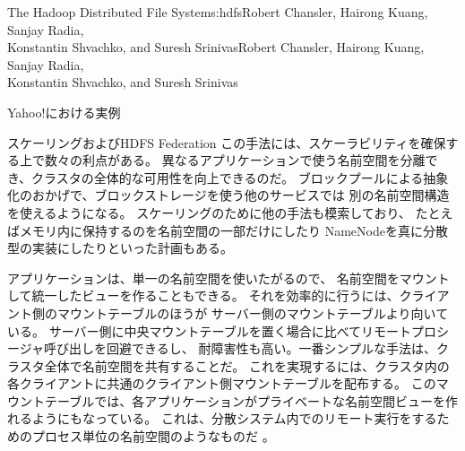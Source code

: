 \begin{aosachaptertoc}{The Hadoop Distributed File System}{s:hdfs}{Robert Chansler, Hairong Kuang, Sanjay Radia, \\ Konstantin Shvachko, and Suresh Srinivas}{Robert Chansler, Hairong Kuang, Sanjay Radia, \\ \hspace*{0.9cm} Konstantin Shvachko, and Suresh Srinivas}
\begin{aosasect1}{Yahoo!における実例}
\begin{aosasect2}{スケーリングおよびHDFS Federation}
この手法には、スケーラビリティを確保する上で数々の利点がある。
異なるアプリケーションで使う名前空間を分離でき、クラスタの全体的な可用性を向上できるのだ。
ブロックプールによる抽象化のおかげで、ブロックストレージを使う他のサービスでは
別の名前空間構造を使えるようになる。
スケーリングのために他の手法も模索しており、
たとえばメモリ内に保持するのを名前空間の一部だけにしたり
NameNodeを真に分散型の実装にしたりといった計画もある。

アプリケーションは、単一の名前空間を使いたがるので、
名前空間をマウントして統一したビューを作ることもできる。
それを効率的に行うには、クライアント側のマウントテーブルのほうが
サーバー側のマウントテーブルより向いている。
サーバー側に中央マウントテーブルを置く場合に比べてリモートプロシージャ呼び出しを回避できるし、
耐障害性も高い。一番シンプルな手法は、クラスタ全体で名前空間を共有することだ。
これを実現するには、クラスタ内の各クライアントに共通のクライアント側マウントテーブルを配布する。
このマウントテーブルでは、各アプリケーションがプライベートな名前空間ビューを作れるようにもなっている。
これは、分散システム内でのリモート実行をするためのプロセス単位の名前空間のようなものだ
\cite{bib:pike:names,bib:radia:naming,bib:radia:naming2}。

\end{aosasect2}

\end{aosasect1}


\end{aosachaptertoc}
